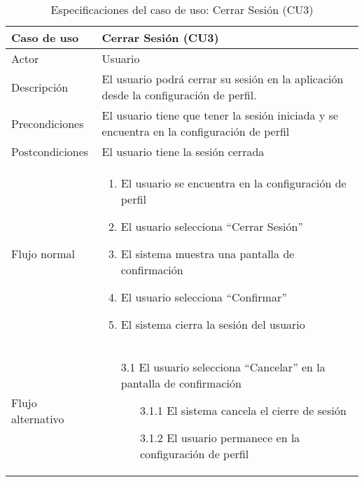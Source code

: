 \begin{table}[h]
    \centering
    \begin{tabular}{|m{3cm}|m{11cm}|}
        \hline
        \rowcolor{blue!20} Caso de uso & Cerrar Sesión (CU3) \\
        \hline
        Actor & Usuario \\
        \hline
        \rowcolor{blue!20} Descripción & El usuario podrá cerrar su sesión en la aplicación desde la configuración de perfil. \\
        \hline
        Precondiciones & El usuario tiene que tener la sesión iniciada y se encuentra en la configuración de perfil \\
        \hline
        \rowcolor{blue!20} Postcondiciones & El usuario tiene la sesión cerrada \\
        \hline
        Flujo normal & 
            \begin{enumerate}[noitemsep]
            \item El usuario se encuentra en la configuración de perfil
            \item El usuario selecciona \enquote{Cerrar Sesión}
            \item El sistema muestra una pantalla de confirmación
            \item El usuario selecciona \enquote{Confirmar}
            \item El sistema cierra la sesión del usuario
            \end{enumerate}
         \\
        \hline
        Flujo alternativo & 
        \begin{enumerate}[noitemsep]
            \item[3.1] El usuario selecciona \enquote{Cancelar} en la pantalla de confirmación
            \begin{enumerate}[noitemsep]
                \item[3.1.1] El sistema cancela el cierre de sesión
                \item[3.1.2] El usuario permanece en la configuración de perfil
            \end{enumerate}
        \end{enumerate} \\
        \hline
    \end{tabular}
    \caption{Especificaciones del caso de uso: Cerrar Sesión (CU3)}
\end{table}
